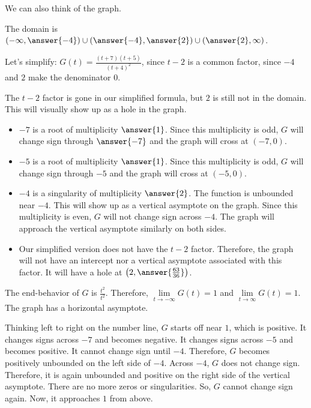 \documentclass{ximera}
\begin{document}
We can also think of the graph. \\


\begin{explanation}



The domain is $\left( -\infty, \answer{-4} \right) \cup \left(\answer{-4}, \answer{2} \right) \cup \left( \answer{2}, \infty \right)$.

Let's simplify: $G(t) = \frac{(t+7)(t+5)}{(t+4)^2}$, since $t-2$ is a common factor, since $-4$ and $2$ make the denominator $0$.



The $t-2$ factor is gone in our simplified formula, but $2$ is still not in the domain.  This will visually show up as a hole in the graph.



\begin{itemize}
\item $-7$ is a root of multiplicity $\answer{1}$.  Since this multiplicity is odd, $G$ will change sign through $\answer{-7}$ and the graph will cross at $(-7,0)$.
\item $-5$ is a root of multiplicity $\answer{1}$.  Since this multiplicity is odd, $G$ will change sign through $-5$ and the graph will cross at $(-5,0)$.
\item $-4$ is a singularity of multiplicity $\answer{2}$.  The function is unbounded near $-4$.  This will show up as a vertical asymptote on the graph. Since this multiplicity is even, $G$ will not change sign across $-4$.  The graph will approach the vertical asymptote similarly on both sides.
\item Our simplified version does not have the $t-2$ factor.  Therefore, the graph will not have an intercept nor a vertical asymptote associated with this factor.  It will have a hole at $\left( 2, \answer{\frac{63}{36}} \right)$.
\end{itemize}


The end-behavior of $G$ is $\frac{t^2}{t^2}$.  Therefore, $\lim\limits_{t \to -\infty}G(t) = 1$ and $\lim\limits_{t \to \infty}G(t) = 1$.  The graph has a horizontal asymptote.




Thinking left to right on the number line, $G$ starts off near $1$, which is positive.  It changes signs across $-7$ and becomes negative. It changes signs across $-5$ and becomes positive.  It cannot change sign until $-4$.  Therefore, $G$ becomes positively unbounded on the left side of $-4$.  Across $-4$, $G$ does not change sign.  Therefore, it is again unbounded and positive on the right side of the vertical asymptote.  There are no more zeros or singularities.  So, $G$ cannot change sign again.  Now, it approaches $1$ from above.





\end{explanation}
\end{document}
